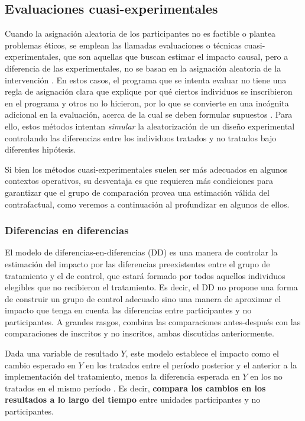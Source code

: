 \documentclass[../../main.tex]{subfiles}
\begin{document}
\subsection{Evaluaciones cuasi-experimentales}
Cuando la asignación aleatoria de los participantes no es factible o plantea problemas
éticos, se emplean las llamadas evaluaciones o técnicas cuasi-experimentales, que son
aquellas que buscan estimar el impacto causal, pero a diferencia de las experimentales, no
se basan en la asignación aleatoria de la intervención \cite{gertler-2016}. En estos
casos, el programa que se intenta evaluar no tiene una regla de asignación clara que
explique por qué ciertos individuos se inscribieron en el programa y otros no lo hicieron,
por lo que se convierte en una incógnita adicional en la evaluación, acerca de la cual se
deben formular supuestos \cite{gertler-2016}. Para ello, estos métodos intentan
\textit{simular} la aleatorización de un diseño experimental controlando las diferencias
entre los individuos tratados y no tratados bajo diferentes hipótesis.

Si bien los métodos cuasi-experimentales suelen ser más adecuados en algunos contextos
operativos, su desventaja es que requieren más condiciones para garantizar que el grupo de
comparación provea una estimación válida del contrafactual, como veremos a continuación al
profundizar en algunos de ellos.

\subsubsection{Diferencias en diferencias}
El modelo de diferencias-en-diferencias (DD) es una manera de controlar la estimación del
impacto por las diferencias preexistentes entre el grupo de tratamiento y el de control,
que estará formado por todos aquellos individuos elegibles que no recibieron el
tratamiento. Es decir, el DD no propone una forma de construir un grupo de control
adecuado sino una manera de aproximar el impacto que tenga en cuenta las diferencias entre
participantes y no participantes. A grandes rasgos, combina las comparaciones
antes-después con las comparaciones de inscritos y no inscritos, ambas discutidas
anteriormente.

Dada una variable de resultado \(Y\), este modelo establece el impacto como el cambio
esperado en \(Y\) en los tratados entre el período posterior y el anterior a la
implementación del tratamiento, menos la diferencia esperada en \(Y\) en los no tratados
en el mismo período \cite{bernal}. Es decir, \textbf{compara los cambios en los resultados
a lo largo del tiempo} entre unidades participantes y no participantes.
\end{document}
